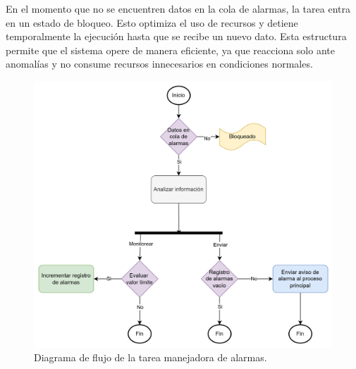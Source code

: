 En el momento que no se encuentren datos en la cola de alarmas, la tarea entra en un estado de bloqueo. Esto optimiza el uso de recursos y detiene temporalmente la ejecución hasta que se recibe un nuevo dato. Esta estructura permite que el sistema opere de manera eficiente, ya que reacciona solo ante anomalías y no consume recursos innecesarios en condiciones normales.

\vspace{1cm}
\begin{figure}[htbp]
	\centering
	\includegraphics[width=1.0\textwidth, height=0.6\textheight]{./Figures/DdF_tarea_manejador_alarmas.png}
	\caption{Diagrama de flujo de la tarea manejadora de alarmas.}
	\label{fig:DdF_tarea_manejador_alarmas}
\end{figure}
\vspace{1cm}

\newpage
